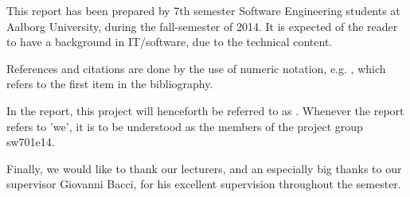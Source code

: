 This report has been prepared by 7th semester Software Engineering students at Aalborg University, during the fall-semester of 2014.
It is expected of the reader to have a background in IT/software, due to the technical content.

References and citations are done by the use of numeric notation, e.g. \cite{civitas-archimedes}, which refers to the first item in the bibliography.

In the report, this project will henceforth be referred to as \projectname.
Whenever the report refers to 'we', it is to be understood as the members of the project group sw701e14.

Finally, we would like to thank our lecturers, and an especially big thanks to our supervisor Giovanni Bacci, for his excellent supervision throughout the semester.
